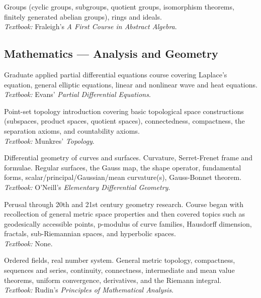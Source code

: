 \documentclass[11pt,letterpaper,sans]{moderncv}
\begin{document}
%
  {Groups (cyclic groups, subgroups, quotient groups, isomorphism theorems, finitely generated abelian groups), rings and ideals. \\ \emph{Textbook: }Fraleigh's \emph{A First Course in Abstract Algebra}.}



\subsection{Mathematics --- Analysis and Geometry}

%
  {Graduate applied partial differential equations course covering Laplace's equation, general elliptic equations, linear and nonlinear wave and heat equations. \\ \emph{Textbook: }Evans' \emph{Partial Differential Equations}.}

%
  {Point-set topology introduction covering basic topological space constructions (subspaces, product spaces, quotient spaces), connectedness, compactness, the separation axioms, and countability axioms. \\ \emph{Textbook: }Munkres' \emph{Topology}.}

%
  {Differential geometry of curves and surfaces. Curvature, Serret-Frenet frame and formulae. Regular surfaces, the Gauss map, the shape operator, fundamental forms, scalar/principal/Gaussian/mean curvature(s), Gauss-Bonnet theorem. \\ \emph{Textbook: }O'Neill's \emph{Elementary Differential Geometry}.}

%
  {Perusal through 20th and 21st century geometry research. Course began with recollection of general metric space properties and then covered topics such as geodesically accessible points, p-modulus of curve families, Hausdorff dimension, fractals, sub-Riemannian spaces, and hyperbolic spaces.  \\ \emph{Textbook: }None.}

%
  {Ordered fields, real number system. General metric topology, compactness, sequences and series, continuity, connectness, intermediate and mean value theorems, uniform convergence, derivatives, and the Riemann integral. \\ \emph{Textbook: }Rudin's \emph{Principles of Mathematical Analysis}.}
\end{document}
